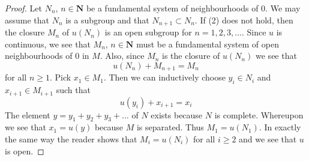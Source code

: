 \begin{proof}
Let $N_n$, $n \in \mathbf{N}$ be a fundamental system of neighbourhoods
of $0$. We may assume that $N_n$ is a subgroup and that
$N_{n + 1} \subset N_n$. If (2) does not hold, then
the closure $M_n$ of $u(N_n)$ is an open subgroup for $n = 1, 2, 3, \ldots$.
Since $u$ is continuous, we see that $M_n$, $n \in \mathbf{N}$
must be a fundamental system of open neighbourhoods of $0$ in $M$.
Also, since $M_n$ is the closure of $u(N_n)$ we see that
$$
u(N_n) + M_{n + 1} = M_n
$$
for all $n \geq 1$. Pick $x_1 \in M_1$. Then we can inductively choose
$y_i \in N_i$ and $x_{i + 1} \in M_{i + 1}$ such that
$$
u(y_i) + x_{i + 1} = x_i
$$
The element $y = y_1 + y_2 + y_3 + \ldots$ of $N$ exists because
$N$ is complete. Whereupon we see that $x_1 = u(y)$ because $M$ is separated.
Thus $M_1 = u(N_1)$. In exactly the same way the reader shows that
$M_i = u(N_i)$ for all $i \geq 2$ and we see that $u$ is open.
\end{proof}









